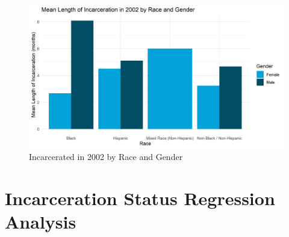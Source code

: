 \documentclass{article}
\begin{document}
\begin{figure}[H]
    \begin{center}
        \includegraphics[width=.85\textwidth]{incar_length_by_racegender.png}
    \end{center}
    \caption{Incarcerated in 2002 by Race and Gender}
    \label{fig:graph}
\end{figure}



\newpage
\section{Incarceration Status Regression Analysis}


\end{document}
